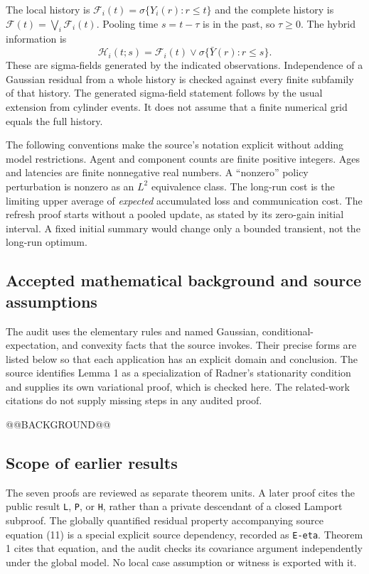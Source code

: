 \documentclass[11pt,letterpaper]{article}
\newcommand{\F}{\mathcal F}
\newcommand{\HH}{\mathcal H}
\begin{document}
The local history is $\F_i(t)=\sigma\{Y_i(r):r\le t\}$ and the complete history is $\F(t)=\bigvee_i\F_i(t)$. Pooling time $s=t-\tau$ is in the past, so $\tau\ge0$. The hybrid information is
\[
\HH_i(t;s)=\F_i(t)\vee\sigma\{\bar Y(r):r\le s\}.
\]
These are sigma-fields generated by the indicated observations. Independence of a Gaussian residual from a whole history is checked against every finite subfamily of that history. The generated sigma-field statement follows by the usual extension from cylinder events. It does not assume that a finite numerical grid equals the full history.

The following conventions make the source's notation explicit without adding model restrictions. Agent and component counts are finite positive integers. Ages and latencies are finite nonnegative real numbers. A ``nonzero'' policy perturbation is nonzero as an $L^2$ equivalence class. The long-run cost is the limiting upper average of \emph{expected} accumulated loss and communication cost. The refresh proof starts without a pooled update, as stated by its zero-gain initial interval. A fixed initial summary would change only a bounded transient, not the long-run optimum.

\subsection{Accepted mathematical background and source assumptions}
The audit uses the elementary rules and named Gaussian, conditional-expectation, and convexity facts that the source invokes. Their precise forms are listed below so that each application has an explicit domain and conclusion. The source identifies Lemma 1 as a specialization of Radner's stationarity condition and supplies its own variational proof, which is checked here. The related-work citations do not supply missing steps in any audited proof.

{\small @@BACKGROUND@@}

\subsection{Scope of earlier results}
The seven proofs are reviewed as separate theorem units. A later proof cites the public result \texttt{L}, \texttt{P}, or \texttt{H}, rather than a private descendant of a closed Lamport subproof. The globally quantified residual property accompanying source equation (11) is a special explicit source dependency, recorded as \texttt{E-eta}. Theorem 1 cites that equation, and the audit checks its covariance argument independently under the global model. No local case assumption or witness is exported with it.
\end{document}

